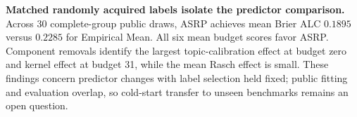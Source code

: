 \textbf{Matched randomly acquired labels isolate the predictor comparison.} Across 30 complete-group public draws, ASRP achieves mean Brier ALC $0.1895$ versus $0.2285$ for Empirical Mean. All six mean budget scores favor ASRP. Component removals identify the largest topic-calibration effect at budget zero and kernel effect at budget 31, while the mean Rasch effect is small. These findings concern predictor changes with label selection held fixed; public fitting and evaluation overlap, so cold-start transfer to unseen benchmarks remains an open question.
